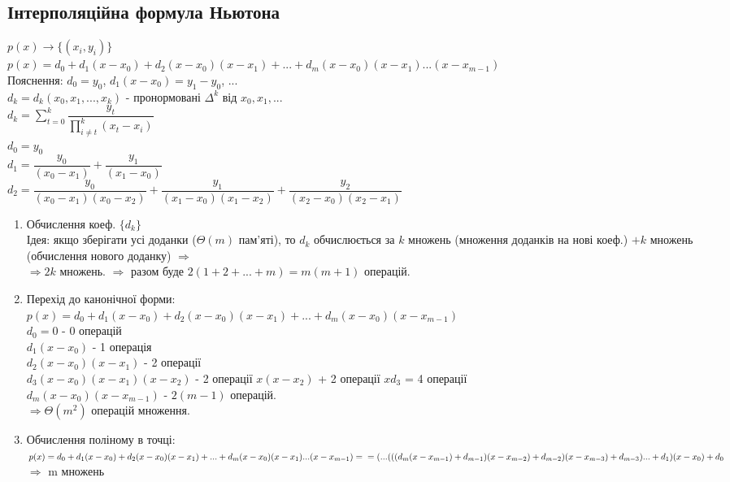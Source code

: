 \documentclass[a4paper,12pt]{article}
\newcommand{\dsum}{\displaystyle\sum}
\begin{document}
    \subsection{Інтерполяційна формула Ньютона}
    $p(x)\rightarrow\{(x_i,y_i)\}$ \\
    $p(x)=d_0+d_1(x-x_0)+d_2(x-x_0)(x-x_1)+...+d_m(x-x_0)(x-x_1)...(x-x_{m-1})$ \\ 
    Пояснення: $d_0=y_0$, $d_1(x-x_0)=y_1-y_0$, ... \\
    $d_k=d_k(x_0,x_1,...,x_k)$ - пронормовані $\Delta^k$ від $x_0,x_1,...$ \\
    $d_k=\dsum\limits_{t=0}^{k}\dfrac{y_t}{\prod\limits_{i\ne t}^{k}(x_t-x_i)}$ \\
    $d_0=y_0$ \\
    $d_1=\dfrac{y_0}{(x_0-x_1)}+\dfrac{y_1}{(x_1-x_0)}$ \\
    $d_2=\dfrac{y_0}{(x_0-x_1)(x_0-x_2)}+\dfrac{y_1}{(x_1-x_0)(x_1-x_2)}+\dfrac{y_2}{(x_2-x_0)(x_2-x_1)}$
    \begin{enumerate}
        \item Обчислення коеф. $\{d_k\}$ \\
        Ідея: якщо зберігати усі доданки ($\Theta(m)$ пам'яті), то $d_k$ обчислюється за $k$ множень (множення доданків на нові коеф.) $+k$ множень (обчислення нового доданку) $\Rightarrow$ \\ $\Rightarrow2k$ множень. $\Rightarrow$ разом буде $2(1+2+...+m)=m(m+1)$ операцій.
        \item Перехід до канонічної форми: \\
        $p(x)=d_0+d_1(x-x_0)+d_2(x-x_0)(x-x_1)+...+d_m(x-x_0)(x-x_{m-1})$ \\
        $d_0=0$ - 0 операцій \\
        $d_1(x-x_0)$ - 1 операція \\
        $d_2(x-x_0)(x-x_1)$ - 2 операції \\
        $d_3(x-x_0)(x-x_1)(x-x_2)$ - 2 операції $x(x-x_2)$ + 2 операції $xd_3$ = 4 операції \\
        $d_m(x-x_0)(x-x_{m-1})$ - $2(m-1)$ операцій. \\
        $\Rightarrow\Theta(m^2)$ операцій множення.
        \item Обчислення поліному в точці: \\
        $p(x)=d_0+d_1(x-x_0)+d_2(x-x_0)(x-x_1)+...+d_m(x-x_0)(x-x_1)...(x-x_{m-1})= \\ =
        (...(((d_m(x-x_{m-1})+d_{m-1})(x-x_{m-2})+d_{m-2})(x-x_{m-3})+d_{m-3})...+d_1)(x-x_0)+d_0$ \\
        $\Rightarrow$ m множень
    \end{enumerate}

\newpage
    



    
    \textbf{}
\end{document}
